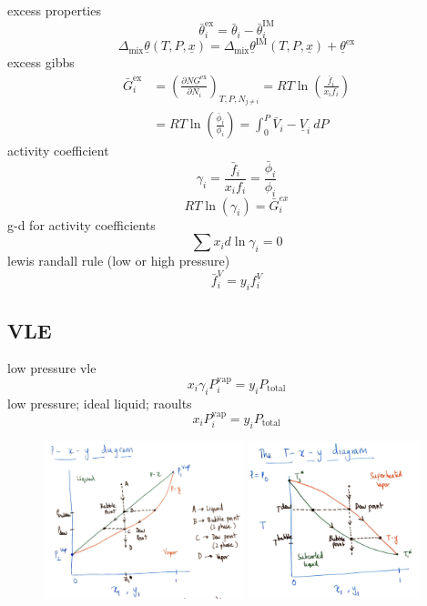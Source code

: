 \documentclass{article}
\begin{document}
excess properties
\[\bar{\theta}^{\text{ex}}_i = \bar{\theta}_{i} - \bar{\theta}^{\text{IM}}_{i}\]
\[\Delta_{\text{mix}}\underline{\theta} (T,P,\underline{x}) = \Delta_{\text{mix}}\underline{\theta}^{\text{IM}}(T,P,\underline{x}) + \underline{\theta}^{\text{ex}}\]
excess gibbs
\begin{align*}
    \bar{G}^{\text{ex}}_{i} &= \left(\frac{ \partial N \underline{G}^{\text{ex}} }{ \partial N_{i} } \right)_{T,P,N_{j \neq i}}  
    = RT \ln \left( \frac{\bar{f}_{i}}{x_{i}f_{i}} \right)  \\ 
    &= RT \ln\left( \frac{\bar{\phi}_{i}}{\phi_{i}} \right) 
    = \int_{0}^P \bar{V}_{i} - \underline{V}_{i} \ dP
\end{align*}
activity coefficient
\[\gamma_{i} = \frac{\bar{f}_{i}}{x_{i} f_{i}} = \frac{\bar{\phi}_{i}}{\phi_{i}} \]
\[RT \ln (\gamma_{i}) = \bar{G}_{i}^{ex}\]
g-d for activity coefficients
\[\sum x_{i} d\ln \gamma_{i} = 0\]
lewis randall rule (low or high pressure)
\[\bar{f}_{i}^V = y_{i} f_{i}^V \]
\subsection*{VLE}
low pressure vle
\[x_{i} \gamma_{i} P^{\text{vap}}_{i} = y_{i}P_{\text{total}}\]
low pressure; ideal liquid; raoults
\[x_{i} P^{\text{vap}}_{i} = y_{i} P_{\text{total}} \]

\begin{figure} %
    \includegraphics[width=0.52\textwidth, frame]{pxy.png}
    \includegraphics[width=0.442\textwidth, frame]{txy.png}
\end{figure}
\end{document}
